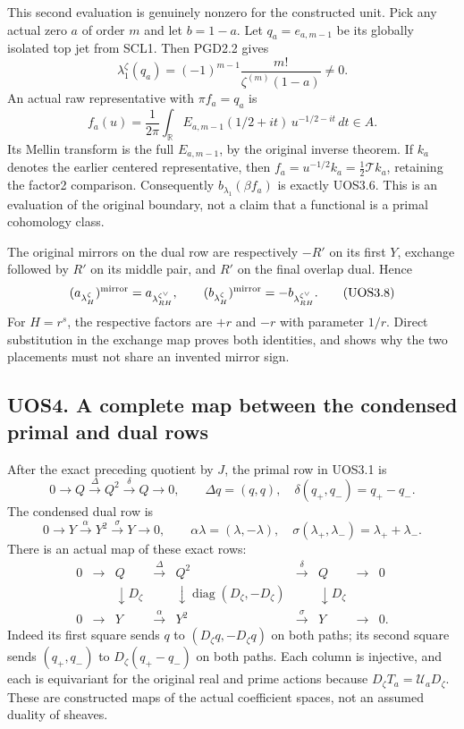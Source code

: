 This second evaluation is genuinely nonzero for the constructed unit.
Pick any actual zero \(a\) of order \(m\) and let \(b=1-a\). Let
\(q_a=e_{a,m-1}\) be its globally isolated top jet from SCL1. Then
PGD2.2 gives \[
 \lambda_1^\zeta(q_a)
 =(-1)^{m-1}\frac{m!}{\zeta^{(m)}(1-a)}\ne0.
 \tag{UOS3.6}
\] An actual raw representative with \(\pi f_a=q_a\) is \[
 f_a(u)=\frac1{2\pi}\int_{\mathbb R}
 E_{a,m-1}(1/2+it)\,u^{-1/2-it}\,dt\in A.
 \tag{UOS3.7}
\] Its Mellin transform is the full \(E_{a,m-1}\), by the original
inverse theorem. If \(k_a\) denotes the earlier centered representative,
then \(f_a=u^{-1/2}k_a=\frac12\mathcal T k_a\), retaining the factor2
comparison. Consequently \(b_{\lambda_1}(\beta f_a)\) is exactly UOS3.6.
This is an evaluation of the original boundary, not a claim that a
functional is a primal cohomology class.

The original mirrors on the dual row are respectively \(-R'\) on its
first \(Y\), exchange followed by \(R'\) on its middle pair, and \(R'\)
on the final overlap dual. Hence \[
 (a_{\lambda_H^\zeta})^{\rm mirror}
    =a_{\lambda_{RH}^{\zeta^\vee}},\qquad
 (b_{\lambda_H^\zeta})^{\rm mirror}
    =-b_{\lambda_{RH}^{\zeta^\vee}}.
 \tag{UOS3.8}
\] For \(H=r^s\), the respective factors are \(+r\) and \(-r\) with
parameter \(1/r\). Direct substitution in the exchange map proves both
identities, and shows why the two placements must not share an invented
mirror sign.

\subsection{UOS4. A complete map between the condensed primal and dual
rows}\label{uos4.-a-complete-map-between-the-condensed-primal-and-dual-rows}

After the exact preceding quotient by \(J\), the primal row in UOS3.1 is
\[
 0\to Q\xrightarrow{\Delta}Q^2\xrightarrow{\delta}Q\to0,
 \qquad\Delta q=(q,q),\quad\delta(q_+,q_-)=q_+-q_-.
\] The condensed dual row is \[
 0\to Y\xrightarrow{\alpha}Y^2\xrightarrow{\sigma}Y\to0,
 \qquad\alpha\lambda=(\lambda,-\lambda),\quad
 \sigma(\lambda_+,\lambda_-)=\lambda_++\lambda_-.
\] There is an actual map of these exact rows: \[
 \begin{array}{ccccccccc}
 0&\to&Q&\xrightarrow{\Delta}&Q^2&\xrightarrow{\delta}&Q&\to&0\\
 &&\downarrow D_\zeta&&
 \downarrow\operatorname{diag}(D_\zeta,-D_\zeta)&&
 \downarrow D_\zeta\\
 0&\to&Y&\xrightarrow{\alpha}&Y^2&\xrightarrow{\sigma}&Y&\to&0.
 \end{array}
 \tag{UOS4.1}
\] Indeed its first square sends \(q\) to \((D_\zeta q,-D_\zeta q)\) on
both paths; its second square sends \((q_+,q_-)\) to
\(D_\zeta(q_+-q_-)\) on both paths. Each column is injective, and each
is equivariant for the original real and prime actions because
\(D_\zeta T_a=\mathcal U_aD_\zeta\). These are constructed maps of the
actual coefficient spaces, not an assumed duality of sheaves.

